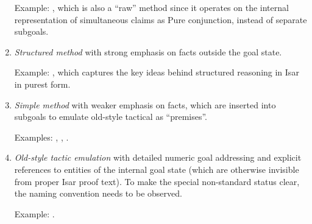 \begin{isabellebody}
\begin{isamarkuptext}
\begin{enumerate}
  Example: \hyperlink{method.induct}{\mbox{}}, which is also a ``raw'' method since it
  operates on the internal representation of simultaneous claims as
  Pure conjunction, instead of separate subgoals.

  \item \emph{Structured method} with strong emphasis on facts outside
  the goal state.

  Example: \hyperlink{method.rule}{\mbox{}}, which captures the key ideas behind
  structured reasoning in Isar in purest form.

  \item \emph{Simple method} with weaker emphasis on facts, which are
  inserted into subgoals to emulate old-style tactical as
  ``premises''.

  Examples: \hyperlink{method.simp}{\mbox{}}, \hyperlink{method.blast}{\mbox{}}, \hyperlink{method.auto}{\mbox{}}.

  \item \emph{Old-style tactic emulation} with detailed numeric goal
  addressing and explicit references to entities of the internal goal
  state (which are otherwise invisible from proper Isar proof text).
  To make the special non-standard status clear, the naming convention
   needs to be observed.

  Example: \hyperlink{method.rule-tac}{\mbox{}}.

  \end{enumerate}


\end{isamarkuptext}
\end{isabellebody}
